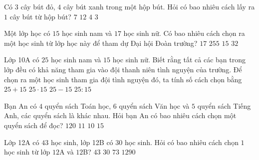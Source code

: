 

\begin{ex}%
	Có $3$ cây bút đỏ, $4$ cây bút xanh trong một hộp bút. Hỏi có bao  nhiêu cách lấy ra $1$ cây bút từ hộp bút?
	\choice 
		{\True $7$} 
		 {$12$}
		 {$4$}
		 {$3$}
\end{ex}

\begin{ex}%
	Một lớp học có $15$ học sinh nam và $17$ học sinh nữ. Có bao nhiêu cách chọn ra một học sinh từ lớp học này để tham dự Đại hội Đoàn trường? 
	\choice 
		{$17$} 
		{$255$} 
		 {$15$}
		{\True $32$} 
\end{ex}

\begin{ex}%
	Lớp  10A có $25$ học sinh nam và $15$ học sinh nữ. Biết rằng tất cả các bạn trong lớp đều có khả năng tham gia vào đội thanh niên tình nguyện của trường. Để chọn ra một học sinh tham gia đội tình nguyện đó, ta tính số cách chọn bằng
	\choice 
		{\True $25+15$} 
		 {$25\cdot 15$}
		{$25-15$} 
		 {$25:15$}
\end{ex}

\begin{ex}%
	Bạn An có $4$ quyển sách Toán học, $6$ quyển sách Văn  học và $5$ quyển sách Tiếng Anh, các quyển sách là khác nhau. Hỏi bạn An có bao nhiêu cách chọn một quyển sách để đọc?
	 \choice
		{$120$} 
		{$11$} 
		 {$10$}
		{\True $15$} 
\end{ex}

\begin{ex}%
	Lớp 12A có $43$ học sinh, lớp 12B có $30$ học sinh. Hỏi có  bao nhiêu cách chọn $1$ học sinh từ lớp $12$A và $12$B?
	\choice 
		{$43$} 
		{$30$} 
		 {\True $73$}
		{$1290$} 
\end{ex}

